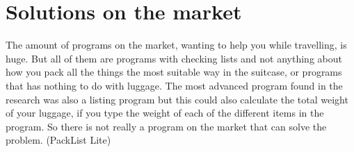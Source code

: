 \section{Solutions on the market}

The amount of programs on the market, wanting to help you while travelling, is huge. But all of them are programs with checking lists and not anything about how you pack all the things the most suitable way in the suitcase, or programs that has nothing to do with luggage. The most advanced program found in the research was also a listing program but this could also calculate the total weight of your luggage, if you type the weight of each of the different items in the program. So there is not really a program on the market that can solve the problem. (PackList Lite)
